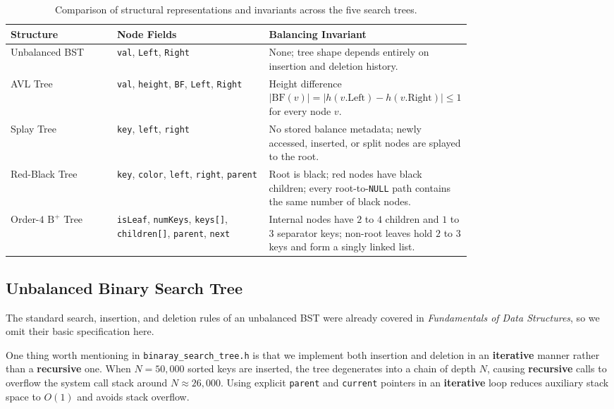 \documentclass[10pt, a4paper]{article}
\newcommand{\code}[1]{\texttt{\color{primary!90!black}#1}}
\newcommand{\bfactor}[1]{\ensuremath{\mathrm{BF}(#1)}}
\begin{document}
\begin{table}[H]
\centering
\caption{Comparison of structural representations and invariants across the five search trees.}
\label{tab:structures}
\begin{tabular}{@{}lp{0.33\linewidth}p{0.43\linewidth}@{}}
\toprule
\textbf{\color{primary}Structure} & \textbf{\color{primary}Node Fields} & \textbf{\color{primary}Balancing Invariant} \\
\midrule
Unbalanced BST & \code{val}, \code{Left}, \code{Right} & None; tree shape depends entirely on insertion and deletion history. \\
AVL Tree & \code{val}, \code{height}, \code{BF}, \code{Left}, \code{Right} & Height difference $|\bfactor{v}| = |h(v.\text{Left}) - h(v.\text{Right})| \le 1$ for every node $v$. \\
Splay Tree & \code{key}, \code{left}, \code{right} & No stored balance metadata; newly accessed, inserted, or split nodes are splayed to the root. \\
Red-Black Tree & \code{key}, \code{color}, \code{left}, \code{right}, \code{parent} & Root is black; red nodes have black children; every root-to-\code{NULL} path contains the same number of black nodes. \\
Order-$4$ $\text{B}^+$ Tree & \code{isLeaf}, \code{numKeys}, \code{keys[]}, \code{children[]}, \code{parent}, \code{next} & Internal nodes have $2$ to $4$ children and $1$ to $3$ separator keys; non-root leaves hold $2$ to $3$ keys and form a singly linked list. \\
\bottomrule
\end{tabular}
\end{table}

\subsection{Unbalanced Binary Search Tree}
The standard search, insertion, and deletion rules of an unbalanced BST were already covered in \emph{Fundamentals of Data Structures}, so we omit their basic specification here.

One thing worth mentioning in \code{binaray\_search\_tree.h} is that we implement both insertion and deletion in an \textbf{iterative} manner rather than a \textbf{recursive} one. When $N=50{,}000$ sorted keys are inserted, the tree degenerates into a chain of depth $N$, causing \textbf{recursive} calls to overflow the system call stack around $N \approx 26{,}000$. Using explicit \code{parent} and \code{current} pointers in an \textbf{iterative} loop reduces auxiliary stack space to $O(1)$ and avoids stack overflow.
\end{document}
